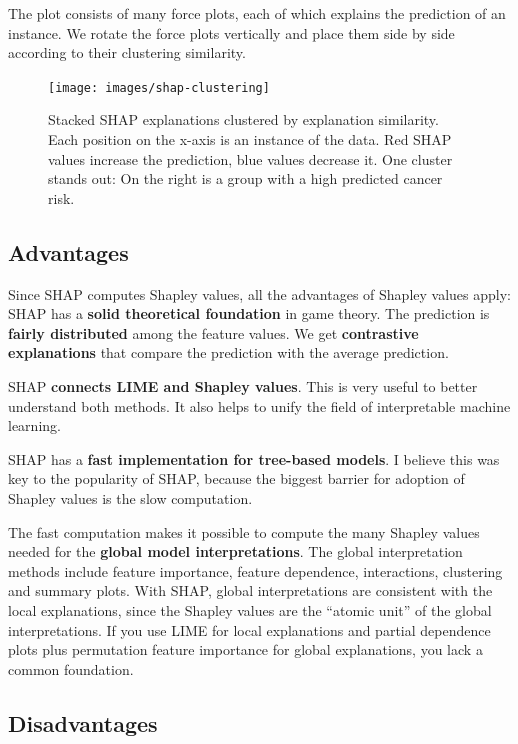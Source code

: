 \documentclass[
  11pt,
]{scrbook}
\begin{document}
The plot consists of many force plots, each of which explains the prediction of an instance.
We rotate the force plots vertically and place them side by side according to their clustering similarity.

\begin{figure}

{\centering \texttt{[image: images/shap-clustering]} 

}

\caption{Stacked SHAP explanations clustered by explanation similarity. Each position on the x-axis is an instance of the data. Red SHAP values increase the prediction, blue values decrease it. One cluster stands out: On the right is a group with a high predicted cancer risk.}\label{fig:unnamed-chunk-49}
\end{figure}

\hypertarget{advantages-17}{%
\subsection{Advantages}\label{advantages-17}}

Since SHAP computes Shapley values, all the advantages of Shapley values apply:
SHAP has a \textbf{solid theoretical foundation} in game theory.
The prediction is \textbf{fairly distributed} among the feature values.
We get \textbf{contrastive explanations} that compare the prediction with the average prediction.

SHAP \textbf{connects LIME and Shapley values}.
This is very useful to better understand both methods.
It also helps to unify the field of interpretable machine learning.

SHAP has a \textbf{fast implementation for tree-based models}.
I believe this was key to the popularity of SHAP, because the biggest barrier for adoption of Shapley values is the slow computation.

The fast computation makes it possible to compute the many Shapley values needed for the \textbf{global model interpretations}.
The global interpretation methods include feature importance, feature dependence, interactions, clustering and summary plots.
With SHAP, global interpretations are consistent with the local explanations, since the Shapley values are the ``atomic unit'' of the global interpretations.
If you use LIME for local explanations and partial dependence plots plus permutation feature importance for global explanations, you lack a common foundation.

\hypertarget{disadvantages-17}{%
\subsection{Disadvantages}\label{disadvantages-17}}
\end{document}
